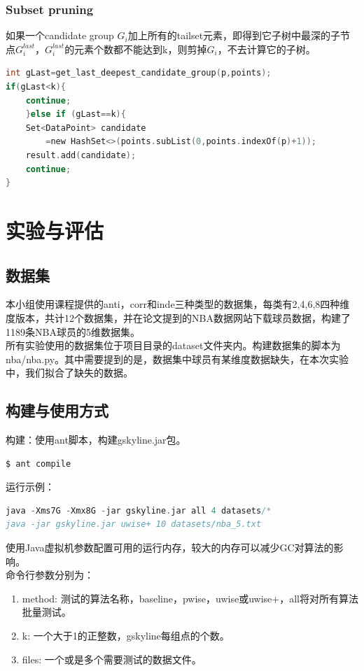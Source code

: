 \documentclass{article}
\begin{document}
\begin{CJK}{UTF8}{gbsn}
\subsubsection{Subset pruning}

如果一个candidate group $G_{i}$加上所有的tailset元素，即得到它子树中最深的子节点$G_{i}^{last}$，$G_{i}^{last}$的元素个数都不能达到k，则剪掉$G_{i}$，不去计算它的子树。
\begin{lstlisting}[language=C]
int gLast=get_last_deepest_candidate_group(p,points);
if(gLast<k){
    continue;
    }else if (gLast==k){
    Set<DataPoint> candidate
        =new HashSet<>(points.subList(0,points.indexOf(p)+1));
    result.add(candidate);
    continue;
}
\end{lstlisting}

\section{实验与评估}
\subsection{数据集}
本小组使用课程提供的anti，corr和inde三种类型的数据集，每类有2,4,6,8四种维度版本，共计12个数据集，并在论文提到的NBA数据网站下载球员数据，构建了1189条NBA球员的5维数据集。\\
所有实验使用的数据集位于项目目录的dataset文件夹内。构建数据集的脚本为nba/nba.py。其中需要提到的是，数据集中球员有某维度数据缺失，在本次实验中，我们拟合了缺失的数据。
\subsection{构建与使用方式}
构建：使用ant脚本，构建gskyline.jar包。\\
\begin{lstlisting}[language=C]
$ ant compile
\end{lstlisting}
运行示例：
\begin{lstlisting}[language=C]
java -Xms7G -Xmx8G -jar gskyline.jar all 4 datasets/*
java -jar gskyline.jar uwise+ 10 datasets/nba_5.txt
\end{lstlisting}
使用Java虚拟机参数配置可用的运行内存，较大的内存可以减少GC对算法的影响。\\
命令行参数分别为：\\
\begin{enumerate}
	\item method: 测试的算法名称，baseline，pwise，uwise或uwise+，all将对所有算法批量测试。
	\item k: 一个大于1的正整数，gskyline每组点的个数。
	\item files: 一个或是多个需要测试的数据文件。
\end{enumerate}

\end{CJK}
\end{document}
